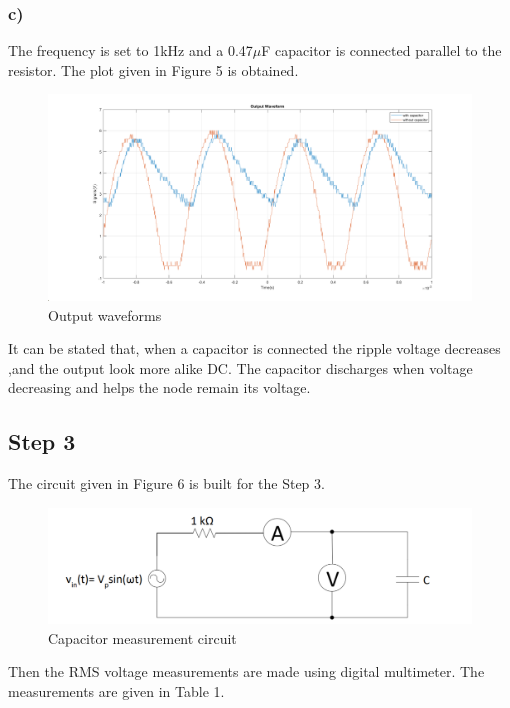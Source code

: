 \documentclass[letterpaper,12pt]{article}
\begin{document}
\subsubsection{c)}
The frequency is set to 1kHz and a 0.47\(\mu\)F capacitor is connected parallel to the resistor. The plot given in Figure 5 is obtained.
\begin{figure}[H]
	\centering
   \includegraphics[width=1\textwidth]{2c_plot.png}
   \caption{Output waveforms}
\end{figure}
It can be stated that, when a capacitor is connected the ripple voltage decreases ,and the output look more alike DC. The capacitor discharges when voltage decreasing and helps the node remain its voltage.

\subsection{Step 3}
The circuit given in Figure 6 is built for the Step 3.
\begin{figure}[H]
	\centering
   \includegraphics[width=1\textwidth]{PRE3.png}
   \caption{Capacitor measurement circuit}
\end{figure}
Then the RMS voltage measurements are made using digital multimeter. The measurements are given in Table 1.
\end{document}
